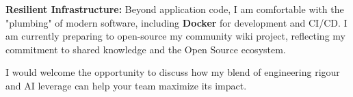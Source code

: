 \documentclass[12pt, a4paper]{awesome-cv}
\begin{document}
\begin{cvletter}
  \textbf{Resilient Infrastructure:} Beyond application code, I am comfortable with the "plumbing" of modern software, including \textbf{Docker} for development and CI/CD. I am currently preparing to open-source my community wiki project, reflecting my commitment to shared knowledge and the Open Source ecosystem.

  I would welcome the opportunity to discuss how my blend of engineering rigour and AI leverage can help your team maximize its impact.

\end{cvletter}

\makeletterclosing
\end{document}
